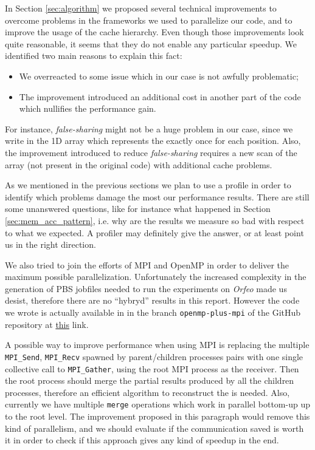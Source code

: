 \documentclass{article}
\begin{document}
In Section \ref{sec:algorithm} we proposed several technical improvements to
overcome problems in the frameworks we used to parallelize our code, and
to improve the usage of the cache hierarchy. Even though those improvements
look quite reasonable, it seems that they do not enable any particular speedup.
We identified two main reasons to explain this fact:
\begin{itemize}
    \item We overreacted to some issue which in our case is not awfully
    problematic;
    \item The improvement introduced an additional cost in another part of the
    code which nullifies the performance gain.
\end{itemize}
For instance, \emph{false-sharing} might not be a huge problem in our case,
since we write in the 1D array which represents the \kdtree{} exactly once for
each position. Also, the improvement introduced to reduce \emph{false-sharing}
requires a new scan of the array (not present in the original code) with
additional cache problems.

As we mentioned in the previous sections we plan to use a profile in order to
identify which problems damage the most our performance results. There are still
some unanswered questions, like for instance what happened in Section
\ref{sec:mem_acc_pattern}, i.e. why are the results we measure so bad with
respect to what we expected. A profiler may definitely give the answer, or at
least point us in the right direction.

We also tried to join the efforts of MPI and OpenMP in order to deliver the
maximum possible parallelization. Unfortunately the increased complexity in the
generation of PBS jobfiles needed to run the experiments on \emph{Orfeo} made us
desist, therefore there are no ``hybryd'' results in this report. However the
code we wrote is actually available in in the branch \texttt{openmp-plus-mpi} of
the GitHub repository at
\href{https://github.com/fAndreuzzi/parallel-kd-tree/tree/openmp-plus-mpi}{this}
link.

A possible way to improve performance when using MPI is replacing the multiple
\texttt{MPI\_Send}, \texttt{MPI\_Recv} spawned by parent/children processes
pairs with one single collective call to \texttt{MPI\_Gather}, using the root
MPI process as the receiver. Then the root process should merge the partial
results produced by all the children processes, therefore an efficient algorithm
to reconstruct the \kdtree{} is needed. Also, currently we have multiple
\texttt{merge} operations which work in parallel bottom-up up to the root level.
The improvement proposed in this paragraph would remove this kind of
parallelism, and we should evaluate if the communication saved is worth it in
order to check if this approach gives any kind of speedup in the end.


\end{document}
